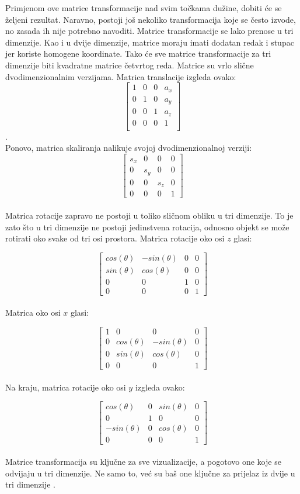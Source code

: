 \documentclass{foi}
\begin{document}
Primjenom ove matrice transformacije nad svim točkama dužine, dobiti će se željeni rezultat. Naravno, postoji još nekoliko transformacija koje se često izvode, no zasada ih nije potrebno navoditi. Matrice transformacije se lako prenose u tri dimenzije. Kao i u dvije dimenzije, matrice moraju imati dodatan redak i stupac jer koriste homogene koordinate. Tako će sve matrice transformacije za tri dimenzije biti kvadratne matrice četvrtog reda. Matrice su vrlo slične dvodimenzionalnim verzijama. Matrica translacije izgleda ovako:
\[
\begin{bmatrix}
	1 & 0 & 0 & a_x\\
	0 & 1 & 0 & a_y\\
	0 & 0 & 1 & a_z\\
	0 & 0 & 0 & 1\\
\end{bmatrix}
\].
\\Ponovo, matrica skaliranja nalikuje svojoj dvodimenzionalnoj verziji:
\[
\begin{bmatrix}
	s_x & 0 & 0 & 0\\
	0 & s_y & 0 & 0\\
	0 & 0 & s_z & 0\\
	0 & 0 & 0 & 1
\end{bmatrix}
\]
\\Matrica rotacije zapravo ne postoji u toliko sličnom obliku u tri dimenzije. To je zato što u tri dimenzije ne postoji jedinstvena rotacija, odnosno objekt se može rotirati oko svake od tri osi prostora. Matrica rotacije oko osi $z$ glasi:

\[
\begin{bmatrix}
	cos(\theta) & -sin(\theta) & 0 & 0\\
	sin(\theta) & cos(\theta) & 0 & 0\\
	0 & 0 & 1 & 0\\
	0 & 0 & 0 & 1
\end{bmatrix}
\]
\\Matrica oko osi $x$ glasi:

\[
\begin{bmatrix}
	1 & 0 & 0 & 0\\
	0 & cos(\theta) & -sin(\theta) & 0\\
	0 & sin(\theta) & cos(\theta) & 0\\
	0 & 0 & 0 & 1
\end{bmatrix}
\]
\\Na kraju, matrica rotacije oko osi $y$ izgleda ovako:

\[
\begin{bmatrix}
	cos(\theta) & 0 & sin(\theta) & 0\\
	0 & 1 & 0 & 0\\
	-sin(\theta) & 0 & cos(\theta) & 0\\
	0 & 0 & 0 & 1
\end{bmatrix}
\]
\\Matrice transformacija su ključne za sve vizualizacije, a pogotovo one koje se odvijaju u tri dimenzije. Ne samo to, već su baš one ključne za prijelaz iz dvije u tri dimenzije \parencite{TransformationMatricesBezDat}.
\end{document}

